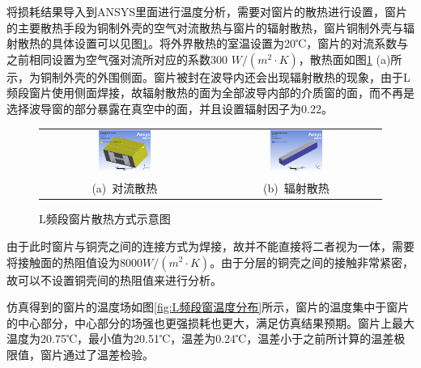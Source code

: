 \documentclass[master]{thesis-uestc}
\begin{document}
将损耗结果导入到ANSYS里面进行温度分析，需要对窗片的散热进行设置，窗片的主要散热手段为铜制外壳的空气对流散热与窗片的辐射散热，窗片铜制外壳与辐射散热的具体设置可以见图\ref{fig:L频段窗片散热示意}。将外界散热的室温设置为20℃，窗片的对流系数与之前相同设置为空气强对流所对应的系数300 \(W/(m^2 \cdot K)\)，散热面如图\ref{fig:L频段窗片散热示意} (a)所示，为铜制外壳的外围侧面。窗片被封在波导内还会出现辐射散热的现象，由于L频段窗片使用侧面焊接，故辐射散热的面为全部波导内部的介质窗的面，而不再是选择波导窗的部分暴露在真空中的面，并且设置辐射因子为0.22。
\begin{figure}[!htb]
    \small
    \centering
    \begin{tabular}{@{\ }c@{\ }c}
        \includegraphics[width=0.32\textwidth]{pic/chapter4/L对流散热.png} & 
        \hspace{5pt}
        \includegraphics[width=0.32\textwidth]{pic/chapter4/L辐射散热.png}     \\
        \mbox{\small (a) 对流散热}                                                                               & 
        \mbox{\small (b) 辐射散热}                                                                                  \\
    \end{tabular}
    \caption{L频段窗片散热方式示意图}
    \label{fig:L频段窗片散热示意}
\end{figure}

由于此时窗片与铜壳之间的连接方式为焊接，故并不能直接将二者视为一体，需要将接触面的热阻值设为8000\(W / (m^2 \cdot K)\)。由于分层的铜壳之间的接触非常紧密，故可以不设置铜壳间的热阻值来进行分析。

仿真得到的窗片的温度场如图\ref{fig:L频段窗温度分布}所示，窗片的温度集中于窗片的中心部分，中心部分的场强也更强损耗也更大，满足仿真结果预期。窗片上最大温度为20.75℃，最小值为20.51℃，温差为0.24℃，温差小于之前所计算的温差极限值，窗片通过了温差检验。
\end{document}
